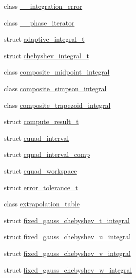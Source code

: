 \begin{DoxyCompactItemize}
\item 
class \hyperlink{class____gnu__cxx_1_1____integration__error}{\+\_\+\+\_\+integration\+\_\+error}
\item 
class \hyperlink{class____gnu__cxx_1_1____phase__iterator}{\+\_\+\+\_\+phase\+\_\+iterator}
\item 
struct \hyperlink{struct____gnu__cxx_1_1adaptive__integral__t}{adaptive\+\_\+integral\+\_\+t}
\item 
struct \hyperlink{struct____gnu__cxx_1_1chebyshev__integral__t}{chebyshev\+\_\+integral\+\_\+t}
\item 
class \hyperlink{class____gnu__cxx_1_1composite__midpoint__integral}{composite\+\_\+midpoint\+\_\+integral}
\item 
class \hyperlink{class____gnu__cxx_1_1composite__simpson__integral}{composite\+\_\+simpson\+\_\+integral}
\item 
class \hyperlink{class____gnu__cxx_1_1composite__trapezoid__integral}{composite\+\_\+trapezoid\+\_\+integral}
\item 
struct \hyperlink{struct____gnu__cxx_1_1compute__result__t}{compute\+\_\+result\+\_\+t}
\item 
struct \hyperlink{struct____gnu__cxx_1_1cquad__interval}{cquad\+\_\+interval}
\item 
struct \hyperlink{struct____gnu__cxx_1_1cquad__interval__comp}{cquad\+\_\+interval\+\_\+comp}
\item 
struct \hyperlink{struct____gnu__cxx_1_1cquad__workspace}{cquad\+\_\+workspace}
\item 
struct \hyperlink{struct____gnu__cxx_1_1error__tolerance__t}{error\+\_\+tolerance\+\_\+t}
\item 
class \hyperlink{class____gnu__cxx_1_1extrapolation__table}{extrapolation\+\_\+table}
\item 
struct \hyperlink{struct____gnu__cxx_1_1fixed__gauss__chebyshev__t__integral}{fixed\+\_\+gauss\+\_\+chebyshev\+\_\+t\+\_\+integral}
\item 
struct \hyperlink{struct____gnu__cxx_1_1fixed__gauss__chebyshev__u__integral}{fixed\+\_\+gauss\+\_\+chebyshev\+\_\+u\+\_\+integral}
\item 
struct \hyperlink{struct____gnu__cxx_1_1fixed__gauss__chebyshev__v__integral}{fixed\+\_\+gauss\+\_\+chebyshev\+\_\+v\+\_\+integral}
\item 
struct \hyperlink{struct____gnu__cxx_1_1fixed__gauss__chebyshev__w__integral}{fixed\+\_\+gauss\+\_\+chebyshev\+\_\+w\+\_\+integral}

\end{DoxyCompactItemize}
